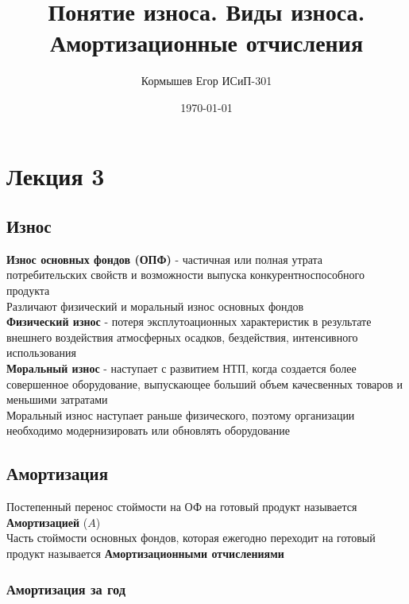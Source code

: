 \documentclass[11pt]{article}
\author{Кормышев Егор ИСиП-301}
\date{\today}
\title{Понятие износа. Виды износа. Амортизационные отчисления}
\begin{document}
\maketitle
\tableofcontents



\section{Лекция 3}
\label{sec:orge4071e8}

\subsection{Износ}
\label{sec:orgba0277b}

\textbf{Износ основных фондов (ОПФ)} - частичная или полная утрата потребительских свойств и возможности выпуска конкурентноспособного продукта \\


Различают физический и моральный износ основных фондов \\


\textbf{Физический износ} - потеря эксплутоационных характеристик в результате внешнего воздействия атмосферных осадков, бездействия, интенсивного использования \\

\textbf{Моральный износ} - наступает с развитием НТП, когда создается более совершенное оборудование, выпускающее больший объем качесвенных товаров и меньшими затратами \\

Моральный износ наступает раньше физического, поэтому организации необходимо модернизировать или обновлять оборудование \\

\subsection{Амортизация}
\label{sec:org5dd3731}

Постепенный перенос стоймости на ОФ на готовый продукт называется \textbf{Амортизацией} (\(A\)) \\

Часть стоймости основных фондов, которая ежегодно переходит на готовый продукт называется \textbf{Амортизационными отчислениями}

\subsubsection{Амортизация за год}
\label{sec:org624dbf8}
\end{document}
